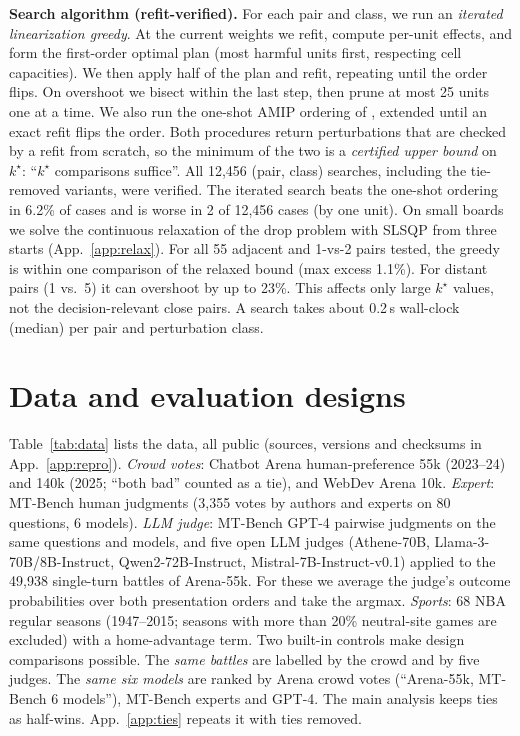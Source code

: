 \documentclass{article}
\newcommand{\kstar}{k^\star}
\begin{document}
\textbf{Search algorithm (refit-verified).} For each pair and class, we run an \emph{iterated linearization greedy}. At the current weights we refit, compute per-unit effects, and form the first-order optimal plan (most harmful units first, respecting cell capacities). We then apply half of the plan and refit, repeating until the order flips. On overshoot we bisect within the last step, then prune at most 25 units one at a time. We also run the one-shot AMIP ordering of \citet{broderick2020automatic}, extended until an exact refit flips the order. Both procedures return perturbations that are checked by a refit from scratch, so the minimum of the two is a \emph{certified upper bound} on $\kstar$: ``$\kstar$ comparisons suffice''. All 12,456 (pair, class) searches, including the tie-removed variants, were verified. The iterated search beats the one-shot ordering in 6.2\% of cases and is worse in 2 of 12,456 cases (by one unit). On small boards we solve the continuous relaxation of the drop problem with SLSQP from three starts (App.~\ref{app:relax}). For all 55 adjacent and 1-vs-2 pairs tested, the greedy is within one comparison of the relaxed bound (max excess 1.1\%). For distant pairs (1 vs.\ 5) it can overshoot by up to 23\%. This affects only large $\kstar$ values, not the decision-relevant close pairs. A search takes about 0.2\,s wall-clock (median) per pair and perturbation class.

\section{Data and evaluation designs}\label{sec:data}

\begin{table}[t]
\caption{Leaderboards. $N$: comparisons after removing competitors with fewer than 50 comparisons; $K$: competitors; ties: fraction of tied outcomes (counted as half-wins).}
\label{tab:data}
\centering\small

\end{table}

Table~\ref{tab:data} lists the data, all public (sources, versions and checksums in App.~\ref{app:repro}). \emph{Crowd votes}: Chatbot Arena human-preference 55k (2023--24) and 140k (2025; ``both bad'' counted as a tie), and WebDev Arena 10k. \emph{Expert}: MT-Bench human judgments (3,355 votes by authors and experts on 80 questions, 6 models). \emph{LLM judge}: MT-Bench GPT-4 pairwise judgments on the same questions and models, and five open LLM judges (Athene-70B, Llama-3-70B/8B-Instruct, Qwen2-72B-Instruct, Mistral-7B-Instruct-v0.1) applied to the 49,938 single-turn battles of Arena-55k. For these we average the judge's outcome probabilities over both presentation orders and take the argmax. \emph{Sports}: 68 NBA regular seasons (1947--2015; seasons with more than 20\% neutral-site games are excluded) with a home-advantage term. Two built-in controls make design comparisons possible. The \emph{same battles} are labelled by the crowd and by five judges. The \emph{same six models} are ranked by Arena crowd votes (``Arena-55k, MT-Bench 6 models''), MT-Bench experts and GPT-4. The main analysis keeps ties as half-wins. App.~\ref{app:ties} repeats it with ties removed.
\end{document}
